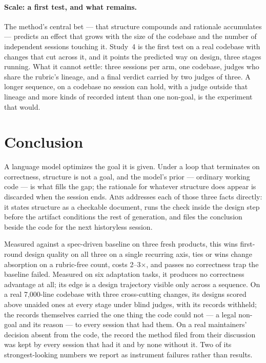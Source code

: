 \documentclass[11pt]{article}
\newcommand{\aims}{\textsc{Aims}}
\begin{document}
\paragraph{Scale: a first test, and what remains.} The method's central bet --- that structure compounds and rationale accumulates --- predicts an effect that grows with the size of the codebase and the number of independent sessions touching it. Study~4 is the first test on a real codebase with changes that cut across it, and it points the predicted way on design, three stages running. What it cannot settle: three sessions per arm, one codebase, judges who share the rubric's lineage, and a final verdict carried by two judges of three. A longer sequence, on a codebase no session can hold, with a judge outside that lineage and more kinds of recorded intent than one non-goal, is the experiment that would.

\section{Conclusion}

A language model optimizes the goal it is given. Under a loop that terminates on correctness, structure is not a goal, and the model's prior --- ordinary working code --- is what fills the gap; the rationale for whatever structure does appear is discarded when the session ends. \aims{} addresses each of those three facts directly: it states structure as a checkable document, runs the check inside the design step before the artifact conditions the rest of generation, and files the conclusion beside the code for the next historyless session.

Measured against a spec-driven baseline on three fresh products, this wins first-round design quality on all three on a single recurring axis, ties or wins change absorption on a rubric-free count, costs 2--3$\times$, and passes no correctness trap the baseline failed. Measured on six adaptation tasks, it produces no correctness advantage at all; its edge is a design trajectory visible only across a sequence. On a real 7,000-line codebase with three cross-cutting changes, its designs scored above unaided ones at every stage under blind judges, with its records withheld; the records themselves carried the one thing the code could not --- a legal non-goal and its reason --- to every session that had them. On a real maintainers' decision absent from the code, the record the method filed from their discussion was kept by every session that had it and by none without it. Two of its strongest-looking numbers we report as instrument failures rather than results.
\end{document}
